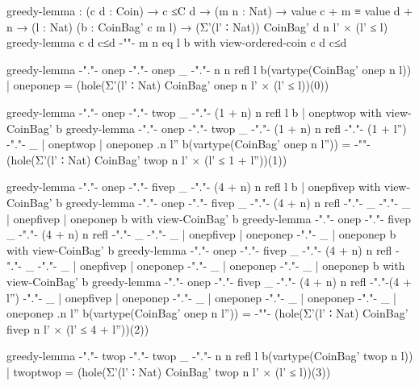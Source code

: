 \begin{figure*}
\setlength{\mathindent}{.2em}
\setlength{\abovedisplayskip}{0em}
\begin{code}
greedy-lemma :  (c d : Coin) → c ≤C d → (m n : Nat) → value c + m ≡ value d + n →
                (l : Nat) (b : CoinBag' c m l) → (Σ'(l' ∶ Nat)) CoinBag' d n l' × (l' ≤ l)
greedy-lemma          c               d      c≤d  {-""-}   m                n        eq             l                   b  with view-ordered-coin c d c≤d

greedy-lemma {-"."-}  onep   {-"."-}  onep   _    {-"."-}  n                n        refl           l                   b(vartype(CoinBag' onep n l))  | oneponep = (hole(Σ'(l' ∶ Nat) CoinBag' onep n l' × (l' ≤ l))(0))

greedy-lemma {-"."-}  onep   {-"."-}  twop   _    {-"."-}  (1 + n)          n        refl           l                   b  | oneptwop   with view-CoinBag' b
greedy-lemma {-"."-}  onep   {-"."-}  twop   _    {-"."-}  (1 + n)          n        refl  {-"."-}  (1 + l'')  {-"."-}  _  | oneptwop   | oneponep {.n} {l''} b(vartype(CoinBag' onep n l'')) =
{-"\hfill"-} (hole(Σ'(l' ∶ Nat) CoinBag' twop n l' × (l' ≤ 1 + l''))(1))

greedy-lemma {-"."-}  onep   {-"."-}  fivep  _    {-"."-}  (4 + n)          n        refl           l                   b  | onepfivep  with view-CoinBag' b
greedy-lemma {-"."-}  onep   {-"."-}  fivep  _    {-"."-}  (4 + n)          n        refl  {-"."-}  _          {-"."-}  _  | onepfivep  | oneponep          b  with view-CoinBag' b
greedy-lemma {-"."-}  onep   {-"."-}  fivep  _    {-"."-}  (4 + n)          n        refl  {-"."-}  _          {-"."-}  _  | onepfivep  | oneponep {-"."-}  _  | oneponep          b  with view-CoinBag' b
greedy-lemma {-"."-}  onep   {-"."-}  fivep  _    {-"."-}  (4 + n)          n        refl  {-"."-}  _          {-"."-}  _  | onepfivep  | oneponep {-"."-}  _  | oneponep {-"."-}  _  | oneponep          b  with view-CoinBag' b
greedy-lemma {-"."-}  onep   {-"."-}  fivep  _    {-"."-}  (4 + n)          n        refl  {-"."-}(4 + l'')    {-"."-}  _  | onepfivep  | oneponep {-"."-}  _  | oneponep {-"."-}  _  | oneponep {-"."-}  _  | oneponep {.n} {l''} b(vartype(CoinBag' onep n l'')) =
{-"\hfill"-} (hole(Σ'(l' ∶ Nat) CoinBag' fivep n l' × (l' ≤ 4 + l''))(2))

greedy-lemma {-"."-}  twop   {-"."-}  twop   _    {-"."-}  n                n        refl           l                   b(vartype(CoinBag' twop n l))  | twoptwop = (hole(Σ'(l' ∶ Nat) CoinBag' twop n l' × (l' ≤ l))(3))


\end{code}
\end{figure*}
